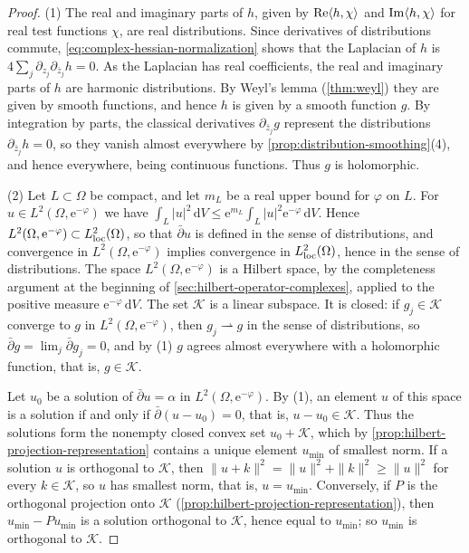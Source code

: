 \begin{proof}
(1) The real and imaginary parts of $h$, given by $\operatorname{Re}\langle h,\chi\rangle$ and $\operatorname{Im}\langle h,\chi\rangle$ for real test functions $\chi$, are real distributions. Since derivatives of distributions commute, \eqref{eq:complex-hessian-normalization} shows that the Laplacian of $h$ is $4\sum_j\partial_{z_j}\partial_{\bar z_j}h=0$. As the Laplacian has real coefficients, the real and imaginary parts of $h$ are harmonic distributions. By Weyl's lemma (\cref{thm:weyl}) they are given by smooth functions, and hence $h$ is given by a smooth function $g$. By integration by parts, the classical derivatives $\partial_{\bar z_j}g$ represent the distributions $\partial_{\bar z_j}h=0$, so they vanish almost everywhere by \cref{prop:distribution-smoothing}(4), and hence everywhere, being continuous functions. Thus $g$ is holomorphic.

(2) Let $L\subset\Omega$ be compact, and let $m_L$ be a real upper bound for $\varphi$ on $L$. For $u\in L^2(\Omega,\mathrm e^{-\varphi})$ we have $\int_L|u|^2\,\mathrm dV\le\mathrm e^{m_L}\int_L|u|^2\mathrm e^{-\varphi}\,\mathrm dV$. Hence $L^2(\Omega,\mathrm e^{-\varphi})\subset L^2_{\mathrm{loc}}(\Omega)$, so that $\bar\partial u$ is defined in the sense of distributions, and convergence in $L^2(\Omega,\mathrm e^{-\varphi})$ implies convergence in $L^2_{\mathrm{loc}}(\Omega)$, hence in the sense of distributions. The space $L^2(\Omega,\mathrm e^{-\varphi})$ is a Hilbert space, by the completeness argument at the beginning of \cref{sec:hilbert-operator-complexes}, applied to the positive measure $\mathrm e^{-\varphi}\,\mathrm dV$. The set $\mathcal K$ is a linear subspace. It is closed: if $g_j\in\mathcal K$ converge to $g$ in $L^2(\Omega,\mathrm e^{-\varphi})$, then $g_j\rightharpoonup g$ in the sense of distributions, so $\bar\partial g=\lim_j\bar\partial g_j=0$, and by (1) $g$ agrees almost everywhere with a holomorphic function, that is, $g\in\mathcal K$.

Let $u_0$ be a solution of $\bar\partial u=\alpha$ in $L^2(\Omega,\mathrm e^{-\varphi})$. By (1), an element $u$ of this space is a solution if and only if $\bar\partial(u-u_0)=0$, that is, $u-u_0\in\mathcal K$. Thus the solutions form the nonempty closed convex set $u_0+\mathcal K$, which by \cref{prop:hilbert-projection-representation} contains a unique element $u_{\min}$ of smallest norm. If a solution $u$ is orthogonal to $\mathcal K$, then $\|u+k\|^2=\|u\|^2+\|k\|^2\geq\|u\|^2$ for every $k\in\mathcal K$, so $u$ has smallest norm, that is, $u=u_{\min}$. Conversely, if $P$ is the orthogonal projection onto $\mathcal K$ (\cref{prop:hilbert-projection-representation}), then $u_{\min}-Pu_{\min}$ is a solution orthogonal to $\mathcal K$, hence equal to $u_{\min}$; so $u_{\min}$ is orthogonal to $\mathcal K$.
\end{proof}

